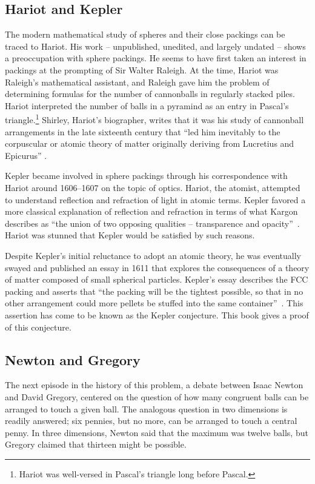 \subsection{Hariot and Kepler}

The modern mathematical study of spheres and their close packings can
be traced to Hariot.  His work -- unpublished, unedited, and
largely undated -- shows a preoccupation with sphere packings.  He
seems to have first taken an interest in packings at the prompting of
Sir Walter Raleigh.  At the time, Hariot was Raleigh's mathematical
assistant, and Raleigh gave him the problem of determining formulas
for the number of cannonballs in regularly stacked piles.  Hariot
interpreted the number of balls in a pyramind as an entry in Pascal's
triangle.\footnote{Hariot was well-versed in Pascal's triangle long
  before Pascal.}  Shirley, Hariot's biographer, writes that it was
his study of cannonball arrangements in the late sixteenth century
that  ``led him inevitably to the corpuscular or atomic
theory of matter originally deriving from Lucretius and Epicurus''
\cite[p.~242]{Shi83}.

Kepler became involved in sphere packings through his correspondence
with Hariot around 1606--1607 on the topic of optics.
Hariot, the atomist, attempted to understand reflection and refraction
of light in atomic terms.  Kepler favored a more classical explanation of
reflection and refraction in terms of what Kargon describes as ``the union of two opposing
qualities -- transparence and opacity''~\cite[p.26]{Kar66}.  
Hariot was stunned that
Kepler would be satisfied by such reasons.

Despite Kepler's initial reluctance to adopt an atomic
theory, he was eventually swayed and  published an essay in  1611
that explores the consequences of a theory of matter composed of small
spherical particles. 
Kepler's essay describes the FCC packing and asserts
that ``the packing will be the tightest possible, so that in no other
arrangement could more pellets be stuffed into the same
container''~\cite{Kep66}.  This assertion has come to be known as the
Kepler conjecture.  This book
gives a proof of this conjecture.

\subsection{Newton and Gregory}

The next episode in the history of this problem,  a debate between
Isaac Newton and David Gregory,  centered on the
question of how many congruent balls  can be arranged to touch
a given ball.  The analogous question in two dimensions is readily answered;
six pennies, but no more, can be arranged
to touch a central penny.  In three dimensions, Newton said that the maximum was
twelve balls, but Gregory claimed that thirteen might be possible.

